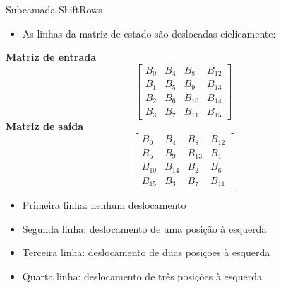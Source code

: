 \documentclass{beamer}
\begin{document}
\begin{frame}{Subcamada ShiftRows}

\begin{itemize}
    \item As linhas da matriz de estado são deslocadas ciclicamente:
\end{itemize}

\textbf{Matriz de entrada}
\[
\begin{bmatrix}
B_0 & B_4 & B_8 & B_{12} \\
B_1 & B_5 & B_9 & B_{13} \\
B_2 & B_6 & B_{10} & B_{14} \\
B_3 & B_7 & B_{11} & B_{15}
\end{bmatrix}
\]
\textbf{Matriz de saída}
\[
\begin{bmatrix}
B_0 & B_4 & B_8 & B_{12} \\
B_5 & B_9 & B_{13} & B_1 \\
B_{10} & B_{14} & B_2 & B_6 \\
B_{15} & B_3 & B_7 & B_{11}
\end{bmatrix}
\]
\begin{itemize}
    \small
    \item Primeira linha: nenhum deslocamento
    \item Segunda linha: deslocamento de uma posição à esquerda
    \item Terceira linha: deslocamento de duas posições à esquerda
    \item Quarta linha: deslocamento de três posições à esquerda
\end{itemize}

\end{frame}


\end{document}
